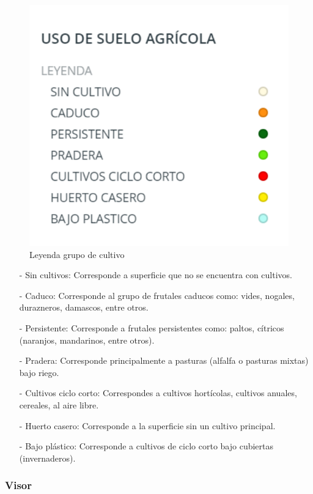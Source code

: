 \documentclass[10pt]{article}
\begin{document}
\begin{figure}[H]
\centering
\includegraphics[scale=0.5]{Figuras_manual/Leyenda_2.pdf}
\caption{Leyenda grupo de cultivo}
\label{2}
\end{figure}

\begin{itemize}
\item[-]Sin cultivos: Corresponde a superficie que no se encuentra con cultivos.
\item[-]Caduco: Corresponde al grupo de frutales caducos como: vides, nogales, durazneros, damascos, entre otros.
\item[-]Persistente: Corresponde a frutales persistentes como: paltos, cítricos (naranjos, mandarinos, entre otros).
\item[-]Pradera: Corresponde principalmente a pasturas (alfalfa o pasturas mixtas) bajo riego.
\item[-]Cultivos ciclo corto: Correspondes a cultivos hortícolas, cultivos anuales, cereales, al aire libre. 
\item[-]Huerto casero: Corresponde a la superficie sin un cultivo principal.
\item[-]Bajo plástico: Corresponde a cultivos de ciclo corto bajo cubiertas (invernaderos).
\end{itemize}

\subsubsection{Visor}
\end{document}
